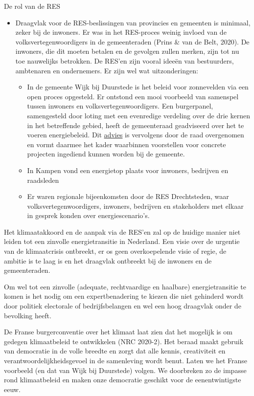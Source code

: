 \begin{voorstel}{De rol van de RES}
\begin{multicols*}{2}
\begin{overwegingen}
\begin{itemize}
	\item Draagvlak voor de RES-beslissingen van provincies en gemeenten is minimaal, zeker bij de inwoners. Er was in het RES-proces weinig invloed van de volksvertegenwoordigers in de gemeenteraden (Prins \& van de Belt, 2020). De inwoners, die dit moeten betalen en de gevolgen zullen merken, zijn tot nu toe nauwelijks betrokken. De RES’en zijn vooral ideeën van bestuurders, ambtenaren en ondernemers. Er zijn wel wat uitzonderingen:
	\begin{itemize}
		\item In de gemeente Wijk bij Duurstede is het beleid voor zonnevelden via een open proces opgesteld. Er ontstond een mooi voorbeeld van samenspel tussen inwoners en volksvertegenwoordigers. Een burgerpanel, samengesteld door loting met een evenredige verdeling over de drie kernen in het betreffende gebied, heeft de gemeenteraad geadviseerd over het te voeren energiebeleid. Dit \href{https://zonneveldenwijkbijduurstede.nl/wp-content/uploads/2019/11/20190613-Advies-Burgerpanel-zonnevelden.pdf}{advies} is vervolgens door de raad overgenomen en vormt daarmee het kader waarbinnen voorstellen voor concrete projecten ingediend kunnen worden bij de gemeente.
		\item In Kampen vond een energietop plaats voor inwoners, bedrijven en raadsleden
		\item Er waren regionale bijeenkomsten door de RES Drechtsteden, waar volksvertegenwoordigers, inwoners, bedrijven en stakeholders met elkaar in gesprek konden over energiescenario’s.
	\end{itemize}
\end{itemize}

Het klimaatakkoord en de aanpak via de RES’en zal op de huidige manier niet leiden tot een zinvolle energietransitie in Nederland. Een visie over de urgentie van de klimaatcrisis ontbreekt, er os geen overkoepelende visie of regie, de ambitie is te laag is en het draagvlak ontbreekt bij de inwoners en de gemeenteraden.

Om wel tot een zinvolle (adequate, rechtvaardige en haalbare) energietransitie te komen is het nodig om een expertbenadering te kiezen die niet gehinderd wordt door politiek electorale of bedrijfsbelangen en wel een hoog draagvlak onder de bevolking heeft.

De Franse burgerconventie over het klimaat laat zien dat het mogelijk is om gedegen klimaatbeleid te ontwikkelen (NRC 2020-2). Het beraad maakt gebruik van democratie in de volle breedte en zorgt dat alle kennis, creativiteit en verantwoordelijkheidsgevoel in de samenleving wordt benut. Laten we het Franse voorbeeld (en dat van Wijk bij Duurstede) volgen. We doorbreken zo de impasse rond klimaatbeleid en maken onze democratie geschikt voor de eenentwintigste eeuw.
\end{overwegingen}


\end{multicols*}
\end{voorstel}
